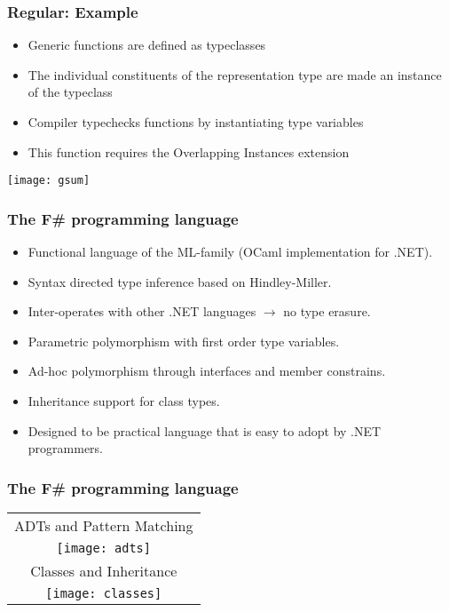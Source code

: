 \documentclass{beamer}
\begin{document}
\begin{frame}

  \frametitle{Regular: Example}


  \begin{multicols}{2}
    \begin{itemize}
    \item Generic functions are defined as typeclasses
    \item The individual constituents of the representation type are
      made an instance of the typeclass
    \item Compiler typechecks functions by instantiating type
      variables
    \item This function requires the Overlapping Instances extension
    \end{itemize}
    \pagebreak
    \texttt{[image: gsum]}
  \end{multicols}
  
\end{frame}

\begin{frame}

  \frametitle{The F\# programming language}

  \begin{itemize}
  \item Functional language of the ML-family (OCaml implementation for .NET).
  \item Syntax directed type inference based on Hindley-Miller.
  \item Inter-operates with other .NET languages $\rightarrow$ no type erasure.
  \item Parametric polymorphism with first order type variables.
  \item Ad-hoc polymorphism through interfaces and member constrains.
  \item Inheritance support for class types.
  \item Designed to be practical language that is easy to adopt by
    .NET programmers.
  \end{itemize}
\end{frame}

\begin{frame}

  \frametitle{The F\# programming language}
  
  \begin{tabular}{c}
    ADTs and Pattern Matching \\
    \texttt{[image: adts]} \\
    Classes and Inheritance \\
    \texttt{[image: classes]} \\
  \end{tabular}
  
\end{frame}
\end{document}
